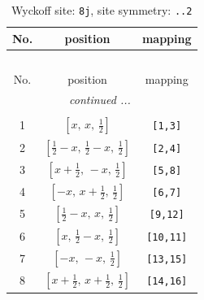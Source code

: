 \documentclass[fleqn,8pt]{jsarticle}
\begin{document}
\begin{longtable}{ccc}
\caption{Wyckoff site: {\tt 8j}, site symmetry: {\tt ..2}}
 \\
 \hline \hline
No. & position & mapping \\ \hline \endfirsthead

\multicolumn{2}{l}{\tablename\ \thetable{}} \\
 \hline \hline
No. & position & mapping \\ \hline \endhead

 \hline \hline
\multicolumn{2}{r}{\footnotesize\it continued ...} \\ \endfoot

 \hline \hline
\multicolumn{2}{r}{} \\ \endlastfoot

1 & $\left[ x,\, x,\, \frac{1}{2} \right]$ & {\tt [1,3]} \\ \hline
2 & $\left[ \frac{1}{2} - x,\, \frac{1}{2} - x,\, \frac{1}{2} \right]$ & {\tt [2,4]} \\ \hline
3 & $\left[ x + \frac{1}{2},\, - x,\, \frac{1}{2} \right]$ & {\tt [5,8]} \\ \hline
4 & $\left[ - x,\, x + \frac{1}{2},\, \frac{1}{2} \right]$ & {\tt [6,7]} \\ \hline
5 & $\left[ \frac{1}{2} - x,\, x,\, \frac{1}{2} \right]$ & {\tt [9,12]} \\ \hline
6 & $\left[ x,\, \frac{1}{2} - x,\, \frac{1}{2} \right]$ & {\tt [10,11]} \\ \hline
7 & $\left[ - x,\, - x,\, \frac{1}{2} \right]$ & {\tt [13,15]} \\ \hline
8 & $\left[ x + \frac{1}{2},\, x + \frac{1}{2},\, \frac{1}{2} \right]$ & {\tt [14,16]} \\
\end{longtable}
\renewcommand{\arraystretch}{1.2}
\end{document}
